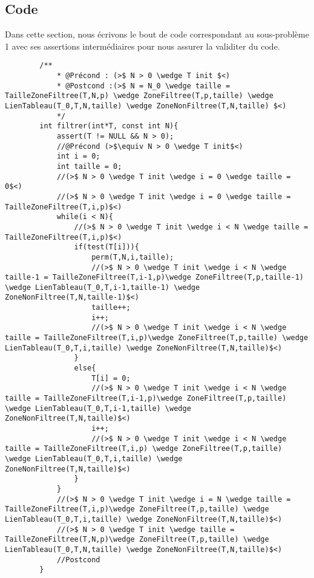 \documentclass[a4paper, 11pt, oneside]{article}
\begin{document}
    \subsection{Code}
        Dans cette section, nous écrivons le bout de code correspondant au sous-problème 1 avec ses assertions
        intermédiaires pour nous assurer la validiter du code.
        \begin{lstlisting}
        /**
            * @Précond : (>$ N > 0 \wedge T init $<)
            * @Postcond :(>$ N = N_0 \wedge taille = TailleZoneFiltree(T,N,p) \wedge ZoneFiltree(T,p,taille) \wedge LienTableau(T_0,T,N,taille) \wedge ZoneNonFiltree(T,N,taille) $<)
            */
        int filtrer(int*T, const int N){
            assert(T != NULL && N > 0);
            //@Précond (>$\equiv N > 0 \wedge T init$<)
            int i = 0;
            int taille = 0;
            //(>$ N > 0 \wedge T init \wedge i = 0 \wedge taille = 0$<)
            //(>$ N > 0 \wedge T init \wedge i = 0 \wedge taille = TailleZoneFiltree(T,i,p)$<)
            while(i < N){
                //(>$ N > 0 \wedge T init \wedge i < N \wedge taille = TailleZoneFiltree(T,i,p)$<)
                if(test(T[i])){
                    perm(T,N,i,taille);
                    //(>$ N > 0 \wedge T init \wedge i < N \wedge taille-1 = TailleZoneFiltree(T,i-1,p)\wedge ZoneFiltree(T,p,taille-1) \wedge LienTableau(T_0,T,i-1,taille-1) \wedge ZoneNonFiltree(T,N,taille-1)$<)
                    taille++;
                    i++;
                    //(>$ N > 0 \wedge T init \wedge i < N \wedge taille = TailleZoneFiltree(T,i,p)\wedge ZoneFiltree(T,p,taille) \wedge LienTableau(T_0,T,i,taille) \wedge ZoneNonFiltree(T,N,taille)$<)
                }
                else{
                    T[i] = 0;
                    //(>$ N > 0 \wedge T init \wedge i < N \wedge taille = TailleZoneFiltree(T,i-1,p)\wedge ZoneFiltree(T,p,taille) \wedge LienTableau(T_0,T,i-1,taille) \wedge ZoneNonFiltree(T,N,taille)$<)
                    i++;
                    //(>$ N > 0 \wedge T init \wedge i < N \wedge taille = TailleZoneFiltree(T,i,p) \wedge ZoneFiltree(T,p,taille) \wedge LienTableau(T_0,T,i,taille) \wedge ZoneNonFiltree(T,N,taille)$<)
                }
            }
            //(>$ N > 0 \wedge T init \wedge i = N \wedge taille = TailleZoneFiltree(T,i,p)\wedge ZoneFiltree(T,p,taille) \wedge LienTableau(T_0,T,i,taille) \wedge ZoneNonFiltree(T,N,taille)$<)
            //(>$ N > 0 \wedge T init \wedge taille = TailleZoneFiltree(T,N,p)\wedge ZoneFiltree(T,p,taille) \wedge LienTableau(T_0,T,N,taille) \wedge ZoneNonFiltree(T,N,taille)$<)
            //Postcond
        }    
        \end{lstlisting}
\end{document}
